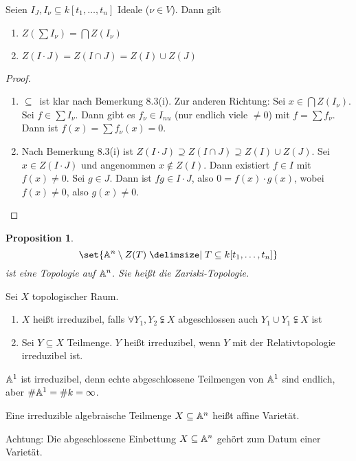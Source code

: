 \documentclass[12pt,a4paper]{scrartcl}
\theoremstyle{cplain}
\newtheorem{prop}[thmcounter]{Proposition}
\theoremstyle{cdef}
\begin{document}
\begin{lem}
	Seien $I_J, I_{\nu}\subseteq k[t_1,\dots, t_n]$ Ideale ($\nu\in V$). Dann gilt
	\begin{enumerate}
		\item $Z(\sum I_{\nu}) = \bigcap Z(I_{\nu})$
		\item $Z(I\cdot J) = Z(I\cap J) = Z(I)\cup Z(J)$
	\end{enumerate}
\end{lem}
\begin{proof}
	\leavevmode
	\begin{enumerate}
		\item \glqq$\subseteq$\grqq\ ist klar nach Bemerkung 8.3(i). Zur anderen Richtung: Sei $x\in\bigcap Z(I_{\nu})$. Sei $f\in\sum I_{\nu}$. Dann gibt es $f_{\nu}\in I_{nu}$ (nur endlich viele $\neq 0$) mit $f = \sum f_{\nu}$. Dann ist $f(x) = \sum f_{\nu}(x) = 0$.
		\item Nach Bemerkung 8.3(i) ist $Z(I\cdot J) \supseteq Z(I\cap J)\supseteq Z(I)\cup Z(J)$. Sei $x\in Z(I\cdot J)$ und angenommen $x\notin Z(I)$. Dann existiert $f\in I$ mit $f(x) \neq 0$. Sei $g\in J$. Dann ist $fg\in I\cdot J$, also $0 = f(x)\cdot g(x)$, wobei $f(x)\neq 0$, also $g(x) \neq 0$.
	\end{enumerate}
\end{proof}
\begin{prop}
	$$\set{\IA^n\setminus Z(T)\given T\subseteq k[t_1,\dots, t_n]}$$
	ist eine Topologie auf $\mathbb A^n$. Sie heißt die Zariski-Topologie.
\end{prop}
\begin{defi}
	Sei $X$ topologischer Raum.
	\begin{enumerate}
		\item $X$ heißt irreduzibel, falls $\forall Y_1, Y_2\subsetneqq X$ abgeschlossen auch $Y_1\cup Y_1\subsetneqq X$ ist
		\item Sei $Y\subseteq X$ Teilmenge. $Y$ heißt irreduzibel, wenn $Y$ mit der Relativtopologie irreduzibel ist. 
	\end{enumerate}
\end{defi}
\begin{bsp}
	$\mathbb A^1$ ist irreduzibel, denn echte abgeschlossene Teilmengen von $\mathbb A^1$ sind endlich, aber $\# \mathbb A^1 = \# k = \infty$.
\end{bsp}
\begin{defi}
	Eine irreduzible algebraische Teilmenge $X\subseteq \mathbb A^n$ heißt affine Varietät.
	
	Achtung: Die abgeschlossene Einbettung $X\subseteq \mathbb A^n$ gehört zum Datum einer Varietät.
\end{defi}
\end{document}
